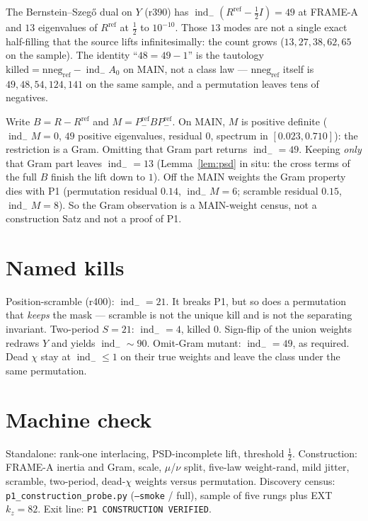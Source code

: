 \documentclass[11pt]{article}
\theoremstyle{remark}
\newcommand{\indm}{\operatorname{ind}_{-}}
\newcommand{\half}{\tfrac12}
\begin{document}
The Bernstein--Szeg\H{o} dual on $Y$ (r390) has
$\indm(R^{\mathrm{ref}}-\half I)=49$ at FRAME-A and
$13$ eigenvalues of $R^{\mathrm{ref}}$ at $\half$ to
$10^{-10}$.
Those $13$ modes are not a single exact half-filling that
the source lifts infinitesimally: the count grows
($13,27,38,62,65$ on the sample).
The identity ``$48=49-1$'' is the tautology
$\mathrm{killed}=\mathrm{nneg}_{\mathrm{ref}}-\indm A_0$ on
MAIN, not a class law --- $\mathrm{nneg}_{\mathrm{ref}}$
itself is $49,48,54,124,141$ on the same sample, and a
permutation leaves tens of negatives.

Write $B=R-R^{\mathrm{ref}}$ and
$M=P^{\mathrm{ref}}_- B P^{\mathrm{ref}}_-$.
On MAIN, $M$ is positive definite
($\indm M=0$, $49$ positive eigenvalues, residual $0$,
spectrum in $[0.023,0.710]$): the restriction is a Gram.
Omitting that Gram part returns $\indm=49$.
Keeping \emph{only} that Gram part leaves $\indm=13$
(Lemma~\ref{lem:psd} in situ: the cross terms of the full
$B$ finish the lift down to $1$).
Off the MAIN weights the Gram property dies with P1
(permutation residual $0.14$, $\indm M=6$; scramble
residual $0.15$, $\indm M=8$).
So the Gram observation is a MAIN-weight census, not a
construction Satz and not a proof of P1.

\section{Named kills}\label{sec:kills}

Position-scramble (r400): $\indm=21$.
It breaks P1, but so does a permutation that \emph{keeps}
the mask --- scramble is not the unique kill and is not the
separating invariant.
Two-period $S=21$: $\indm=4$, killed $0$.
Sign-flip of the union weights redraws $Y$ and yields
$\indm\sim 90$.
Omit-Gram mutant: $\indm=49$, as required.
Dead $\chi$ stay at $\indm\le 1$ on their true weights and
leave the class under the same permutation.

\section*{Machine check}

Standalone: rank-one interlacing, PSD-incomplete lift,
threshold $\half$.
Construction: FRAME-A inertia and Gram, scale, $\mu$/$\nu$
split, five-law weight-rand, mild jitter, scramble,
two-period, dead-$\chi$ weights versus permutation.
Discovery census: \texttt{p1\_construction\_probe.py}
(\texttt{--smoke} / full), sample of five rungs plus EXT
$k_z=82$.
Exit line: \texttt{P1 CONSTRUCTION VERIFIED}.
\end{document}
